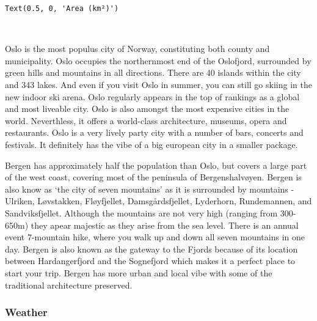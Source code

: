 \documentclass[11pt]{article}
\makeatletter
\newcommand{\boxspacing}{\kern\kvtcb@left@rule\kern\kvtcb@boxsep}
\newcommand{\prompt}[4]{
        \ttfamily\llap{{\color{#2}[#3]:\hspace{3pt}#4}}\vspace{-\baselineskip}
    }
\makeatother
\begin{document}
            \begin{tcolorbox}[breakable, size=fbox, boxrule=.5pt, pad at break*=1mm, opacityfill=0]
\prompt{Out}{outcolor}{301}{\boxspacing}
\begin{Verbatim}[commandchars=\\\{\}]
Text(0.5, 0, 'Area (km²)')
\end{Verbatim}
\end{tcolorbox}
        
    \begin{center}
    \end{center}
    { \hspace*{\fill} \\}
    
    Oslo is the most populus city of Norway, constituting both county and
municipality. Oslo occupies the northernmost end of the Oslofjord,
surrounded by green hills and mountains in all directions. There are 40
islands within the city and 343 lakes. And even if you visit Oslo in
summer, you can still go skiing in the new indoor ski arena. Oslo
regularly appears in the top of rankings as a global and most liveable
city. Oslo is also amongst the most expensive cities in the world.
Neverthless, it offers a world-class architecture, museums, opera and
restaurants. Oslo is a very lively party city with a number of bars,
concerts and festivals. It definitely has the vibe of a big european
city in a smaller package.

Bergen has approximately half the population than Oslo, but covers a
large part of the west coast, covering most of the peninsula of
Bergenshalvøyen. Bergen is also know as `the city of seven mountains' as
it is surrounded by mountains - Ulriken, Løvstakken, Fløyfjellet,
Damsgårdsfjellet, Lyderhorn, Rundemannen, and Sandviksfjellet. Although
the mountains are not very high (ranging from 300-650m) they apear
majestic as they arise from the sea level. There is an annual event
7-mountain hike, where you walk up and down all seven mountains in one
day. Bergen is also known as the gateway to the Fjords because of its
location between Hardangerfjord and the Sognefjord which makes it a
perfect place to start your trip. Bergen has more urban and local vibe
with some of the traditional architecture preserved.

    \hypertarget{weather}{%
\subsubsection{Weather}\label{weather}}
\end{document}
